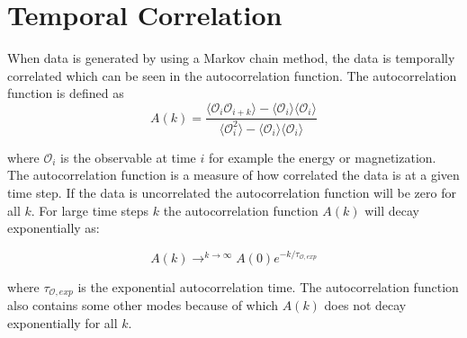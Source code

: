 \section{Temporal Correlation}

When data is generated by using a Markov chain method, the data is temporally
correlated which can be seen in the autocorrelation function. The
autocorrelation function is defined as
\begin{equation}
  \label{eq:autocorrelation}
  A(k) = \frac{\langle \mathcal{O}_i \mathcal{O}_{i+k}\rangle - \langle\mathcal{O}_i\rangle\langle\mathcal{O}_i\rangle}{\langle\mathcal{O}_i^2\rangle- \langle\mathcal{O}_i\rangle\langle\mathcal{O}_i\rangle}
\end{equation}

where $\mathcal{O}_i$ is the observable at time $i$ for example the energy or
magnetization. The autocorrelation function is a measure of how correlated the
data is at a given time step. If the data is uncorrelated the autocorrelation
function will be zero for all $k$. For large time steps $k$ the autocorrelation
function $A(k)$ will decay exponentially as:

\begin{equation}
  \label{eq:autocorrelation_decay}
  A(k) \longrightarrow^{k\rightarrow\infty} A(0)e^{-k/\tau_{\mathcal{O}, exp}}
\end{equation}

where $\tau_{\mathcal{O}, exp}$ is the exponential autocorrelation time. The
autocorrelation function also contains some other modes because of which $A(k)$
does not decay exponentially for all $k$. 